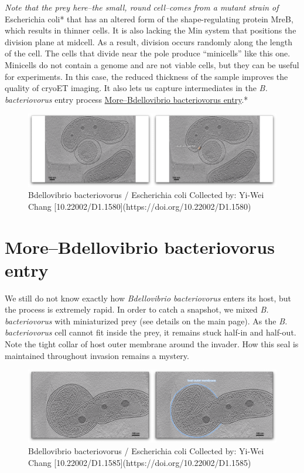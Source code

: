 \documentclass[]{tufte-book}
\begin{document}
\emph{Note that the prey here--the small, round cell--comes from a
mutant strain of }Escherichia coli* that has an altered form of the
shape-regulating protein MreB, which results in thinner cells. It is
also lacking the Min system that positions the division plane at
midcell. As a result, division occurs randomly along the length of the
cell. The cells that divide near the pole produce ``minicells'' like
this one. Minicells do not contain a genome and are not viable cells,
but they can be useful for experiments. In this case, the reduced
thickness of the sample improves the quality of cryoET imaging. It also
lets us capture intermediates in the \emph{B. bacteriovorus} entry
process
\protect\hyperlink{morebdellovibrio-bacteriovorus-entry}{More--Bdellovibrio
bacteriovorus entry}.*

\begin{figure}
\includegraphics{movie_stills/9_10} \caption[Bdellovibrio bacteriovorus / Escherichia coli Collected by]{Bdellovibrio bacteriovorus / Escherichia coli Collected by: Yi-Wei Chang [10.22002/D1.1580](https://doi.org/10.22002/D1.1580)}\label{fig:unnamed-chunk-170}
\end{figure}

\hypertarget{morebdellovibrio-bacteriovorus-entry}{\section{More--Bdellovibrio
bacteriovorus entry}\label{morebdellovibrio-bacteriovorus-entry}}

We still do not know exactly how \emph{Bdellovibrio bacteriovorus}
enters its host, but the process is extremely rapid. In order to catch a
snapshot, we mixed \emph{B. bacteriovorus} with miniaturized prey (see
details on the main page). As the \emph{B. bacteriovorus} cell cannot
fit inside the prey, it remains stuck half-in and half-out. Note the
tight collar of host outer membrane around the invader. How this seal is
maintained throughout invasion remains a mystery.

\begin{figure}
\includegraphics{movie_stills/9_10a} \caption[Bdellovibrio bacteriovorus / Escherichia coli Collected by]{Bdellovibrio bacteriovorus / Escherichia coli Collected by: Yi-Wei Chang [10.22002/D1.1585](https://doi.org/10.22002/D1.1585)}\label{fig:unnamed-chunk-171}
\end{figure}
\end{document}
